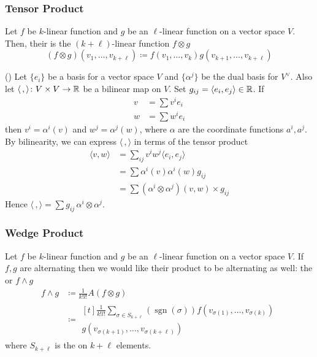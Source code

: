 \subsubsection{Tensor Product}

Let \(f\) be \(k\)-linear function and \(g\) be an \(\ell\)-linear function on a vector space \(V\). Then, their  is the \((k+\ell)\)-linear function \(f\otimes g\)
\begin{equation}
    (f \otimes g) (v_1, \dots, v_{k+\ell}) \coloneqq f(v_1, \dots, v_k)g(v_{k+1}, \dots, v_{k+\ell})
\end{equation}

\begin{example}
    () Let \(\{e_i\}\) be a basis for a vector space \(V\) and \(\{\alpha^j\}\) be the dual basis for \(V^\vee\). Also let \(\langle\,,\rangle\colon V \times V \rightarrow \mathbb{R}\) be a bilinear map on \(V\). Set \(g_{ij} = \langle e_i, e_j \rangle\in \mathbb{R}\). If
    \begin{align}
        v & = \sum v^i e_i \\
        w & = \sum w^i e_i
    \end{align}
    then \(v^i = \alpha^i(v)\) and \(w^j = \alpha^j(w)\), where \(\alpha\) are the coordinate functions \(a^i, a^j\). By bilinearity, we can express \(\langle\,,\rangle\) in terms of the tensor product
    \begin{equation}
        \begin{split}
            \langle v,w \rangle &= \sum_{ij} v^i w^j \langle e_i, e_j\rangle \\
            &= \sum \alpha^i(v) \alpha^i(w) g_{ij} \\
            &= \sum (\alpha^i \otimes \alpha^j)(v,w) \times g_{ij}
        \end{split}
    \end{equation}
    Hence \(\langle\,,\rangle = \sum g_{ij}\, \alpha^i \otimes \alpha^j\).
\end{example}

\subsubsection{Wedge Product}

Let \(f\) be \(k\)-linear function and \(g\) be an \(\ell\)-linear function on a vector space \(V\).
If  \(f,g\) are alternating then we would like their product to be alternating as well: the  or  \(f \wedge g\)
\begin{align}
    f \wedge g & \coloneqq \frac{1}{k!l!}  A(f \otimes g) \\
               & \coloneqq 
               \begin{multlined}[t]
                    \frac{1}{k!l!}  \sum_{\sigma \in S_{k+\ell}} (\operatorname{sgn}(\sigma)) f(v_{\sigma(1)}, \dots, v_{\sigma(k)}) \\ 
                    g(v_{\sigma(k+1)}, \dots, v_{\sigma(k+\ell)})
                \end{multlined}
\end{align}
where \(S_{k+\ell}\) is the  on \(k+\ell\) elements.

